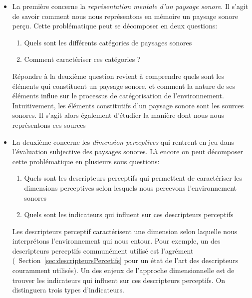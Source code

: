 \begin{itemize}
\item La première concerne la \emph{représentation mentale d'un paysage sonore}. Il s'agit de savoir comment nous nous représentons en mémoire un paysage sonore perçu. Cette problématique peut se décomposer en deux questions:

\begin{enumerate}
\item Quels sont les différents catégories de paysages sonores
\item Comment caractériser ces catégories ?
\end{enumerate}

Répondre à la deuxième question revient à  comprendre quels sont les éléments qui constituent un paysage sonore, et comment la nature de ses éléments influe sur le processus de catégorisation de l'environnement. Intuitivement, les éléments constitutifs d'un paysage sonore sont les sources sonores. Il s'agit alors également d'étudier la manière dont nous nous représentons ces sources

\item La deuxième concerne les \emph{dimension perceptives} qui rentrent en jeu dans l'évaluation subjective des paysages sonores. Là encore on peut décomposer cette problématique en plusieurs sous questions:

\begin{enumerate}
\item Quels sont les descripteurs perceptifs qui permettent de caractériser les dimensions perceptives selon lesquels nous percevons l'environnement sonores
\item Quels sont les indicateurs qui influent sur ces descripteurs perceptifs
\end{enumerate}

Les descripteurs perceptif caractérisent une dimension selon laquelle nous interprétons l'environnement qui nous entour. Pour exemple, un des descripteurs perceptifs communément utilisé est l'agrément (\Cf~Section~\ref{sec:descripteursPercetifs} pour un état de l'art des descripteurs couramment utilisés). Un des enjeux de l'approche dimensionnelle est de trouver les indicateurs qui influent sur ces descripteurs perceptifs. On distinguera trois types d'indicateurs.


\end{itemize}
